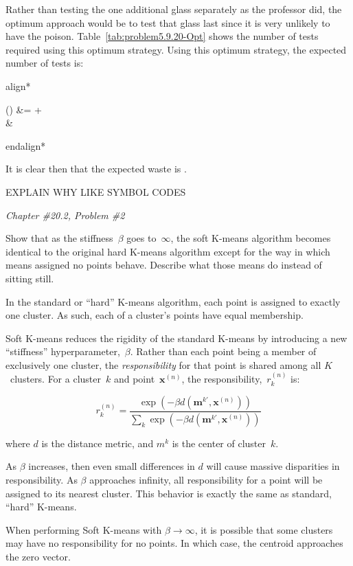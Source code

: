\documentclass{report}
\newenvironment{aligncustom}
{ \csname align*\endcsname %
    \centering
}
{
  \csname endalign*\endcsname
}
\newcounter{subProbCount}       %
\newenvironment{problemshell}{
  \par%
  \medskip
  \leftskip=0pt\rightskip=0pt%
}
{
  \par\medskip
  \setcounter{subProbCount}{1} %
}
\newenvironment{problem}[3]
{%
  \begin{problemshell}
    \noindent \textit{Chapter \##1.#2, Problem \##3} \\
    \bfseries
}
{
  \end{problemshell}
}
\begin{document}
  Rather than testing the one additional glass separately as the professor did, the optimum approach would be to test that glass last since it is very unlikely to have the poison.  Table~\ref{tab:problem5.9.20-Opt} shows the number of tests required using this optimum strategy.    Using this optimum strategy, the expected number of tests is:
 
  
  \begin{aligncustom}
    () &=   +   \\
    &\approx {} 
  \end{aligncustom}
  
  It is clear then that the expected waste is .

  {\color{red} EXPLAIN WHY LIKE SYMBOL CODES}

  \newpage
  \begin{problem}{20}{2}{2}
    Show that as the stiffness~$\beta$ goes to~$\infty$, the soft K-means algorithm becomes identical to the original hard K-means algorithm except for the way in which means assigned no points behave.  Describe what those means do instead of sitting still.
  \end{problem}

  In the standard or ``hard'' K-means algorithm, each point is assigned to exactly one cluster.  As such, each of a cluster's points have equal membership.
  
  Soft K-means reduces the rigidity of the standard K-means by introducing a new ``stiffness'' hyperparameter,~$\beta$.  Rather than each point being a member of exclusively one cluster, the \textit{responsibility} for that point is shared among all $K$~clusters.  For a cluster~$k$ and point~$\textbf{x}^{(n)}$, the responsibility,~$r_{k}^{(n)}$ is: 
  
  \begin{equation}
    r_k^{(n)} = \frac{\exp(-\beta d(\textbf{m}^{k'}, \textbf{x}^{(n)}))}{\sum_{k} \exp(-\beta d(\textbf{m}^{k'}, \textbf{x}^{(n)}))}
  \end{equation}
  
  \noindent
  where $d$ is the distance metric, and $m^{k}$ is the center of cluster~$k$.
  
  As $\beta$ increases, then even small differences in $d$ will cause massive disparities in responsibility.  As $\beta$ approaches infinity, all responsibility for a point will be assigned to its nearest cluster.  This behavior is exactly the same as standard, ``hard'' K-means.
  
  When performing Soft K-means with $\beta \rightarrow \infty$, it is possible that some clusters may have no responsibility for no points.  In which case, the centroid approaches the zero vector.
  
  
\end{document}
